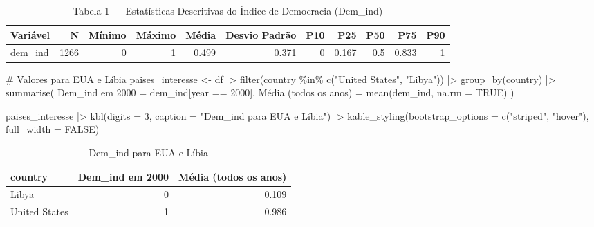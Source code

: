 \documentclass[
  portuguese,
  letterpaper,
  DIV=11,
  numbers=noendperiod]{scrartcl}
\newenvironment{Shaded}{\begin{snugshade}}{\end{snugshade}}
\newcommand{\AttributeTok}[1]{\textcolor[rgb]{0.40,0.45,0.13}{#1}}
\newcommand{\CommentTok}[1]{\textcolor[rgb]{0.37,0.37,0.37}{#1}}
\newcommand{\ConstantTok}[1]{\textcolor[rgb]{0.56,0.35,0.01}{#1}}
\newcommand{\DecValTok}[1]{\textcolor[rgb]{0.68,0.00,0.00}{#1}}
\newcommand{\FunctionTok}[1]{\textcolor[rgb]{0.28,0.35,0.67}{#1}}
\newcommand{\NormalTok}[1]{\textcolor[rgb]{0.00,0.23,0.31}{#1}}
\newcommand{\OtherTok}[1]{\textcolor[rgb]{0.00,0.23,0.31}{#1}}
\newcommand{\SpecialCharTok}[1]{\textcolor[rgb]{0.37,0.37,0.37}{#1}}
\newcommand{\StringTok}[1]{\textcolor[rgb]{0.13,0.47,0.30}{#1}}
\begin{document}
\begin{table}
\centering
\caption{\label{tab:estatisticas-descritivas}Tabela 1 — Estatísticas Descritivas do Índice de Democracia (Dem_ind)}
\centering
\begin{tabular}[t]{l|r|r|r|r|r|r|r|r|r|r}
\hline
Variável & N & Mínimo & Máximo & Média & Desvio Padrão & P10 & P25 & P50 & P75 & P90\\
\hline
dem\_ind & 1266 & 0 & 1 & 0.499 & 0.371 & 0 & 0.167 & 0.5 & 0.833 & 1\\
\hline
\end{tabular}
\end{table}

\begin{Shaded}
\begin{Highlighting}[]
\CommentTok{\# Valores para EUA e Líbia}
\NormalTok{paises\_interesse }\OtherTok{\textless{}{-}}\NormalTok{ df }\SpecialCharTok{|\textgreater{}}
  \FunctionTok{filter}\NormalTok{(country }\SpecialCharTok{\%in\%} \FunctionTok{c}\NormalTok{(}\StringTok{"United States"}\NormalTok{, }\StringTok{"Libya"}\NormalTok{)) }\SpecialCharTok{|\textgreater{}}
  \FunctionTok{group\_by}\NormalTok{(country) }\SpecialCharTok{|\textgreater{}}
  \FunctionTok{summarise}\NormalTok{(}
    \StringTok{\textasciigrave{}}\AttributeTok{Dem\_ind em 2000}\StringTok{\textasciigrave{}} \OtherTok{=}\NormalTok{ dem\_ind[year }\SpecialCharTok{==} \DecValTok{2000}\NormalTok{],}
    \StringTok{\textasciigrave{}}\AttributeTok{Média (todos os anos)}\StringTok{\textasciigrave{}} \OtherTok{=} \FunctionTok{mean}\NormalTok{(dem\_ind, }\AttributeTok{na.rm =} \ConstantTok{TRUE}\NormalTok{)}
\NormalTok{  )}

\NormalTok{paises\_interesse }\SpecialCharTok{|\textgreater{}}
  \FunctionTok{kbl}\NormalTok{(}\AttributeTok{digits =} \DecValTok{3}\NormalTok{,}
      \AttributeTok{caption =} \StringTok{"Dem\_ind para EUA e Líbia"}\NormalTok{) }\SpecialCharTok{|\textgreater{}}
  \FunctionTok{kable\_styling}\NormalTok{(}\AttributeTok{bootstrap\_options =} \FunctionTok{c}\NormalTok{(}\StringTok{"striped"}\NormalTok{, }\StringTok{"hover"}\NormalTok{), }\AttributeTok{full\_width =} \ConstantTok{FALSE}\NormalTok{)}
\end{Highlighting}
\end{Shaded}

\begin{table}
\centering
\caption{\label{tab:paises-especificos}Dem_ind para EUA e Líbia}
\centering
\begin{tabular}[t]{l|r|r}
\hline
country & Dem\_ind em 2000 & Média (todos os anos)\\
\hline
Libya & 0 & 0.109\\
\hline
United States & 1 & 0.986\\
\hline
\end{tabular}
\end{table}
\end{document}
